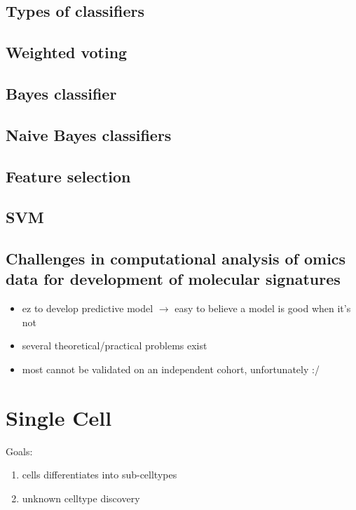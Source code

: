 \documentclass[font=12pt]{article}
\begin{document}
\subsection{Types of classifiers}

\subsection{Weighted voting}

\subsection{Bayes classifier}

\subsection{Naive Bayes classifiers}

\subsection{Feature selection}

\subsection{SVM}

\subsection{Challenges in computational analysis of omics data for development of molecular signatures}
\begin{itemize}
	\item ez to develop predictive model $\to$ easy to believe a model is good when it's not
	\item several theoretical/practical problems exist
	\item most cannot be validated on an independent cohort, unfortunately :/
\end{itemize}

\newpage
\section{Single Cell}
Goals:
\begin{enumerate}
	\item cells differentiates into sub-celltypes
	\item unknown celltype discovery
\end{enumerate}
\end{document}
